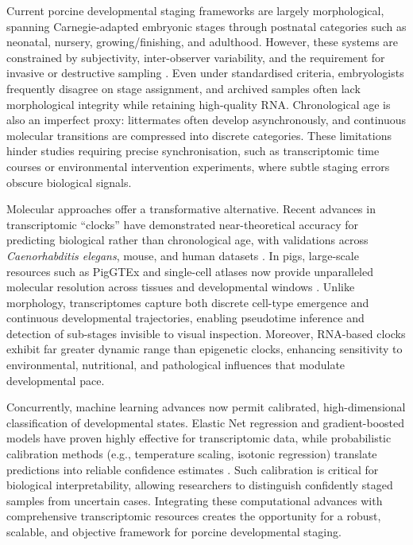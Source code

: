 \documentclass[11pt]{article}
\begin{document}
Current porcine developmental staging frameworks are largely morphological, spanning Carnegie-adapted embryonic stages through postnatal categories such as neonatal, nursery, growing/finishing, and adulthood. However, these systems are constrained by subjectivity, inter-observer variability, and the requirement for invasive or destructive sampling \cite{bendus2006,mogelt2020,orrahilly2010}. Even under standardised criteria, embryologists frequently disagree on stage assignment, and archived samples often lack morphological integrity while retaining high-quality RNA. Chronological age is also an imperfect proxy: littermates often develop asynchronously, and continuous molecular transitions are compressed into discrete categories. These limitations hinder studies requiring precise synchronisation, such as transcriptomic time courses or environmental intervention experiments, where subtle staging errors obscure biological signals.

Molecular approaches offer a transformative alternative. Recent advances in transcriptomic ``clocks'' have demonstrated near-theoretical accuracy for predicting biological rather than chronological age, with validations across \textit{Caenorhabditis elegans}, mouse, and human datasets \cite{schachtschneider2021,zhengh2023}. In pigs, large-scale resources such as PigGTEx and single-cell atlases now provide unparalleled molecular resolution across tissues and developmental windows \cite{jin2021,teng2024,simpson2024}. Unlike morphology, transcriptomes capture both discrete cell-type emergence and continuous developmental trajectories, enabling pseudotime inference and detection of sub-stages invisible to visual inspection. Moreover, RNA-based clocks exhibit far greater dynamic range than epigenetic clocks, enhancing sensitivity to environmental, nutritional, and pathological influences that modulate developmental pace.

Concurrently, machine learning advances now permit calibrated, high-dimensional classification of developmental states. Elastic Net regression and gradient-boosted models have proven highly effective for transcriptomic data, while probabilistic calibration methods (e.g., temperature scaling, isotonic regression) translate predictions into reliable confidence estimates \cite{lee2021,lukyanenko2021}. Such calibration is critical for biological interpretability, allowing researchers to distinguish confidently staged samples from uncertain cases. Integrating these computational advances with comprehensive transcriptomic resources creates the opportunity for a robust, scalable, and objective framework for porcine developmental staging.
\end{document}
